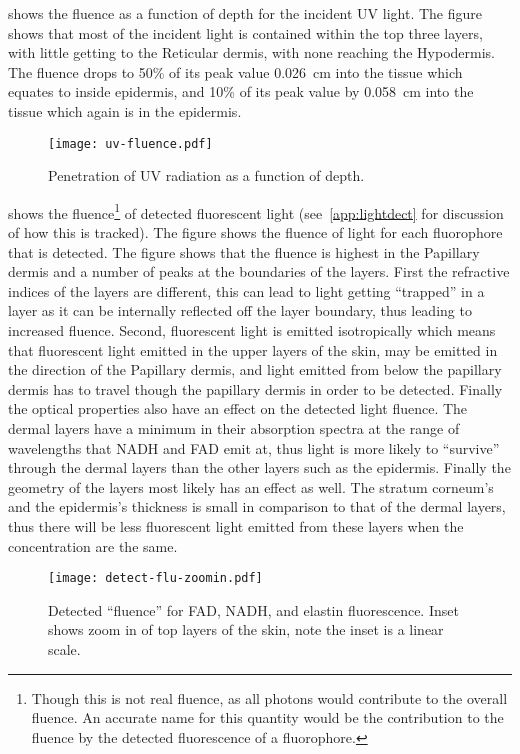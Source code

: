 shows the fluence as a function of depth for the incident UV light.
The figure shows that most of the incident light is contained within the top three layers, with little getting to the Reticular dermis, with none reaching the Hypodermis.
The fluence drops to 50\% of its peak value 0.026~cm into the tissue which equates to inside epidermis, and 10\% of its peak value by 0.058~cm into the tissue which again is in the epidermis.

\begin{figure}[!htpb]
    \centering
    \texttt{[image: uv-fluence.pdf]}
    \caption{Penetration of UV radiation as a function of depth.}
    \label{fig:uvpen}
\end{figure}

 shows the fluence\footnote{Though this is not real fluence, as all photons would contribute to the overall fluence. An accurate name for this quantity would be the contribution to the fluence by the detected fluorescence of a fluorophore.} of detected fluorescent light (see~\cref{app:lightdect} for discussion of how this is tracked).
The figure shows the fluence of light for each fluorophore that is detected.
The figure shows that the fluence is highest in the Papillary dermis and a number of peaks at the boundaries of the layers.
First the refractive indices of the layers are different, this can lead to light getting ``trapped'' in a layer as it can be internally reflected off the layer boundary, thus leading to increased fluence.
Second, fluorescent light is emitted isotropically which means that fluorescent light emitted in the upper layers of the skin, may be emitted in the direction of the Papillary dermis, and light emitted from below the papillary dermis has to travel though the papillary dermis in order to be detected.
Finally the optical properties also have an effect on the detected light fluence.
The dermal layers have a minimum in their absorption spectra at the range of wavelengths that NADH and FAD emit at, thus light is more likely to ``survive'' through the dermal layers than the other layers such as the epidermis.
Finally the geometry of the layers most likely has an effect as well.
The stratum corneum's and the epidermis's thickness is small in comparison to that of the dermal layers, thus there will be less fluorescent light emitted from these layers when the concentration are the same.

\begin{figure}[!htpb]
    \centering
    \texttt{[image: detect-flu-zoomin.pdf]}
    \caption{Detected ``fluence'' for FAD, NADH, and elastin fluorescence. Inset shows zoom in of top layers of the skin, note the inset is a linear scale.}
    \label{fig:fadnadhboth}
\end{figure}

